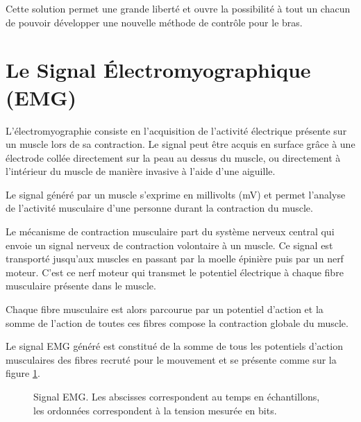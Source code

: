 \documentclass[letterpaper, twoside, 12pt, memoire, creativecommons, hyperref]{thETS}
\begin{document}
Cette solution permet une grande liberté et ouvre la possibilité à tout un chacun de pouvoir développer une nouvelle méthode de contrôle pour le bras.

\section{Le Signal Électromyographique (EMG)}

L'électromyographie consiste en l'acquisition de l'activité électrique présente sur un muscle lors de sa contraction. Le signal peut être acquis en surface grâce à une électrode collée directement sur la peau au dessus du muscle, ou directement à l'intérieur du muscle de manière invasive à l'aide d'une aiguille.

Le signal généré par un muscle s'exprime en millivolts (mV) et permet l'analyse de l'activité musculaire d'une personne durant la contraction du muscle.

Le mécanisme de contraction musculaire part du système nerveux central qui envoie un signal nerveux de contraction volontaire à un muscle. Ce signal est transporté jusqu'aux muscles en passant par la moelle épinière puis par un nerf moteur. C'est ce nerf moteur qui transmet le potentiel électrique à chaque fibre musculaire présente dans le muscle. 

Chaque fibre musculaire est alors parcourue par un potentiel d'action et la somme de l'action de toutes ces fibres compose la contraction globale du muscle.

Le signal EMG généré est constitué de la somme de tous les potentiels d'action musculaires des fibres recruté pour le mouvement et se présente comme sur la figure \ref{fig:emg}.

\begin{figure}
	\centering
	\caption{Signal EMG. Les abscisses correspondent au temps en échantillons, les ordonnées correspondent à la tension mesurée en bits.}
	\label{fig:emg}
\end{figure}
\end{document}
